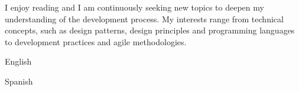 \documentclass[10pt,a4paper,ragged2d,withhyper]{altacv}
\begin{document}
\begin{paracol}{2}
I enjoy reading and I am continuously seeking new topics to deepen my understanding of the development process. My interests range from technical concepts, such as design patterns, design principles and programming languages to development practices and agile methodologies.




English\\
\divider

Spanish

\medskip



\divider


\end{paracol}
\end{document}
